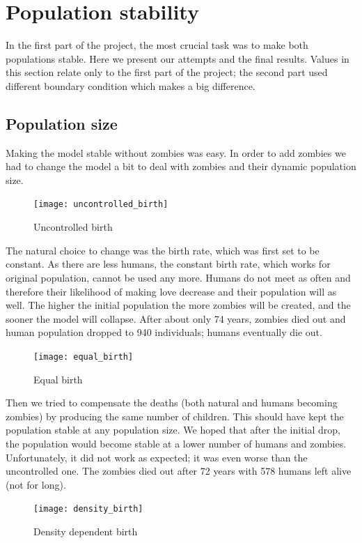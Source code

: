 \documentclass[a4paper]{article}
\begin{document}
\section{Population stability}

In the first part of the project, the most crucial task was to make both populations stable.
Here we present our attempts and the final results.
Values in this section relate only to the first part of the project; the second part used different boundary condition which makes a big difference.

\subsection{Population size}

Making the model stable without zombies was easy.
In order to add zombies we had to change the model a bit to deal with zombies and their dynamic population size.

\begin{figure}[pht]
    \centering
    \texttt{[image: uncontrolled\_birth]}
    \caption{Uncontrolled birth}
\end{figure}

The natural choice to change was the birth rate, which was first set to be constant.
As there are less humans, the constant birth rate, which works for original population, cannot be used any more.
Humans do not meet as often and therefore their likelihood of making love decrease and their population will as well.
The higher the initial population the more zombies will be created, and the sooner the model will collapse.
After about only 74 years, zombies died out and human population dropped to 940 individuals; humans eventually die out.

\begin{figure}[pht]
    \centering
    \texttt{[image: equal\_birth]}
    \caption{Equal birth}
\end{figure}

Then we tried to compensate the deaths (both natural and humans becoming zombies) by producing the same number of children.
This should have kept the population stable at any population size.
We hoped that after the initial drop, the population would become stable at a lower number of humans and zombies.
Unfortunately, it did not work as expected; it was even worse than the uncontrolled one.
The zombies died out after 72 years with 578 humans left alive (not for long).

\begin{figure}[pht]
    \centering
    \texttt{[image: density\_birth]}
    \caption{Density dependent birth}
\end{figure}
\end{document}
